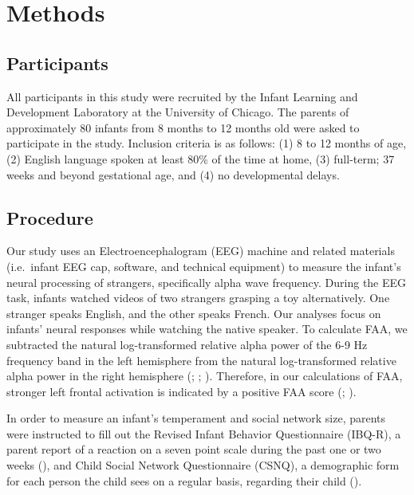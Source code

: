 \documentclass[
  man,
  floatsintext,
  longtable,
  nolmodern,
  notxfonts,
  notimes,
  colorlinks=true,linkcolor=blue,citecolor=blue,urlcolor=blue]{apa7}
\begin{document}
\section{Methods}\label{methods}

\subsection{Participants}\label{participants}

All participants in this study were recruited by the Infant Learning and
Development Laboratory at the University of Chicago. The parents of
approximately 80 infants from 8 months to 12 months old were asked to
participate in the study. Inclusion criteria is as follows: (1) 8 to 12
months of age, (2) English language spoken at least 80\% of the time at
home, (3) full-term; 37 weeks and beyond gestational age, and (4) no
developmental delays.

\subsection{Procedure}\label{procedure}

Our study uses an Electroencephalogram (EEG) machine and related
materials (i.e.~infant EEG cap, software, and technical equipment) to
measure the infant's neural processing of strangers, specifically alpha
wave frequency. During the EEG task, infants watched videos of two
strangers grasping a toy alternatively. One stranger speaks English, and
the other speaks French. Our analyses focus on infants' neural responses
while watching the native speaker. To calculate FAA, we subtracted the
natural log-transformed relative alpha power of the 6-9 Hz frequency
band in the left hemisphere from the natural log-transformed relative
alpha power in the right hemisphere
(;
; ).
Therefore, in our calculations of FAA, stronger left frontal activation
is indicated by a positive FAA score
(; ).

In order to measure an infant's temperament and social network size,
parents were instructed to fill out the Revised Infant Behavior
Questionnaire (IBQ-R), a parent report of a reaction on a seven point
scale during the past one or two weeks
(), and Child Social Network Questionnaire (CSNQ), a
demographic form for each person the child sees on a regular basis,
regarding their child
().
\end{document}
